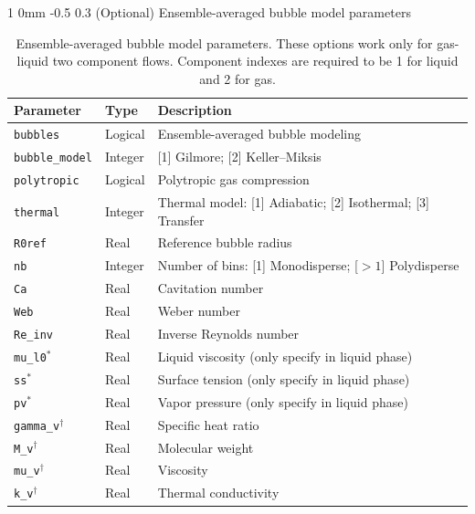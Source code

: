 \documentclass[11pt]{article}
\makeatletter
\renewcommand{\subsubsection}{\@startsection
{subsubsection}%
{1}%
{0mm}%
{-0.5\baselineskip}%
{0.3\baselineskip}%
{\normalfont\normalsize\bfseries\color{myBrown}}}%
\newcommand\tablefont{\footnotesize}
\makeatother
\begin{document}
\subsubsection{(Optional) Ensemble-averaged bubble model parameters}

\begin{table}[H]
{\tablefont
\begin{tabularx}{6.5in}{ | R{1.5in} C{1in} Q{3.5in} | }
\hline
	\textbf{Parameter} & \textbf{Type} & \textbf{Description} \\ \hline
    \texttt{bubbles} 		& 	Logical	& Ensemble-averaged bubble modeling	 \\
    \texttt{bubble\_model} 	& 	Integer	& [1] Gilmore; [2] Keller--Miksis	 \\
    \texttt{polytropic} 		& 	Logical	& Polytropic gas compression	 \\
    \texttt{thermal} 		& 	Integer	& Thermal model: [1] Adiabatic; [2] Isothermal; [3] Transfer	 \\
    \texttt{R0ref} 			& 	Real		& Reference bubble radius	 \\
    \texttt{nb} 			& 	Integer	& Number of bins: [1] Monodisperse; [$>1$] Polydisperse	 \\
    \texttt{Ca} 			& 	Real		& Cavitation number	 \\
    \texttt{Web} 			& 	Real		& Weber number 	 \\
    \texttt{Re\_inv} 		& 	Real		& Inverse Reynolds number \\
    \texttt{mu\_l0}$^*$	& 	Real 		&	Liquid viscosity (only specify in liquid phase)  \\
    \texttt{ss}$^*$		& 	Real 		&	Surface tension (only specify in liquid phase) \\
    \texttt{pv}$^*$		& 	Real 		&	Vapor pressure (only specify in liquid phase)  \\ 
    \texttt{gamma\_v}$^\dagger$	& Real 	&	Specific heat ratio \\
    \texttt{M\_v}$^\dagger$	& 	Real 		& Molecular weight \\
    \texttt{mu\_v}$^\dagger$	& 	Real 		&	Viscosity \\
    \texttt{k\_v}$^\dagger$	& 	Real 		&	Thermal conductivity  \\ \hline
\end{tabularx}}
\caption{Ensemble-averaged bubble model parameters. These options work only for gas-liquid two component flows. Component indexes are required to be 1 for liquid and 2 for gas.}
\label{t:bubbles}
\end{table}
\end{document}
